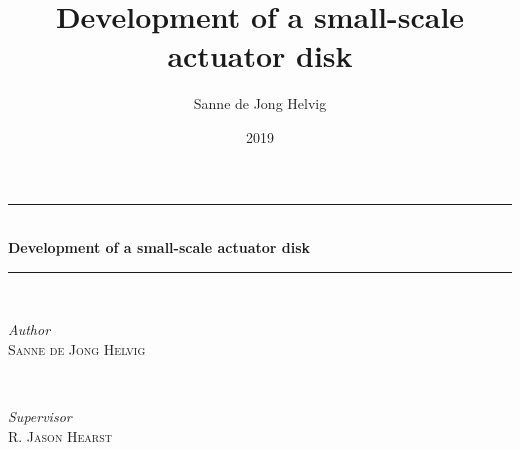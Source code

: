 \documentclass[pdftex,10pt,b5paper,twoside]{book}
\title{Development of a small-scale actuator disk}
\author{Sanne de Jong Helvig}
\date{2019}
\begin{document}
\begin{titlepage} %
	\newcommand{\HRule}{\rule{\linewidth}{0.5mm}} %
	
	\center %
	
	
	
	
	
	
	\HRule\\[0.4cm]
	
	{\huge\bfseries 
	{
	Development of a small-scale actuator disk}\\[0.4cm] %
	}
	
	\HRule\\[1.5cm]
	
	
	\begin{minipage}{0.4\textwidth}
		\begin{flushleft}
			\large
			\textit{Author}\\
			\textsc{Sanne de Jong Helvig} %
		\end{flushleft}
	\end{minipage}
	~
	\begin{minipage}{0.4\textwidth}
		\begin{flushright}
			\large
			\textit{Supervisor}\\
			\textsc{R. Jason Hearst}\\ %
		\end{flushright}
	\end{minipage}
	

\end{titlepage}
\end{document}
